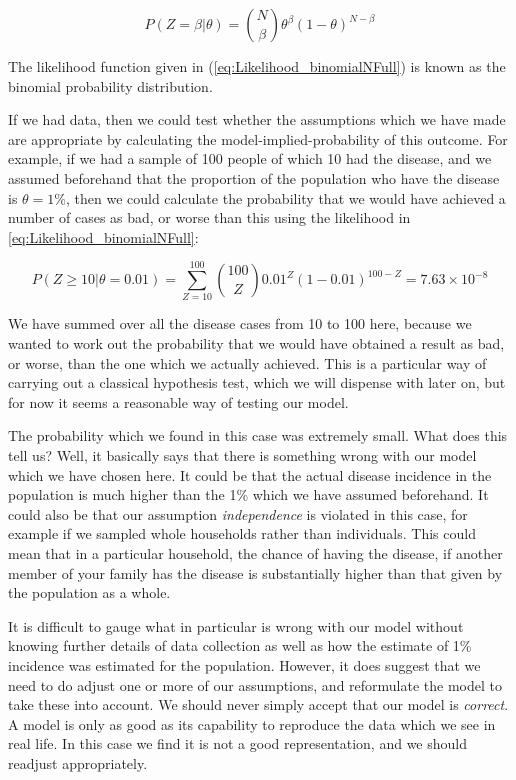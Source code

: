 \documentclass[11pt,fullpage]{book}
\begin{document}
\begin{equation}
P(Z=\beta|\theta) = {N \choose \beta} \theta^\beta (1-\theta)^{N-\beta}
\end{equation}\label{eq:Likelihood_binomialNFull}

The likelihood function given in (\ref{eq:Likelihood_binomialNFull}) is known as the binomial probability distribution.

If we had data, then we could test whether the assumptions which we have made are appropriate by calculating the model-implied-probability of this outcome. For example, if we had a sample of 100 people of which 10 had the disease, and we assumed beforehand that the proportion of the population who have the disease is $\theta=1\%$, then we could calculate the probability that we would have achieved a number of cases as bad, or worse than this using the likelihood in \ref{eq:Likelihood_binomialNFull}:

\begin{equation}
P(Z\geq 10|\theta=0.01) = \sum\limits_{Z=10}^{100}{100 \choose Z} 0.01^Z (1-0.01)^{100-Z} = 7.63 \times 10^{-8}
\end{equation}\label{eq:Likelihood_binomialTest}

We have summed over all the disease cases from 10 to 100 here, because we wanted to work out the probability that we would have obtained a result as bad, or worse, than the one which we actually achieved. This is a particular way of carrying out a classical hypothesis test, which we will dispense with later on, but for now it seems a reasonable way of testing our model. 

The probability which we found in this case was extremely small. What does this tell us? Well, it basically says that there is something wrong with our model which we have chosen here. It could be that the actual disease incidence in the population is much higher than the 1\% which we have assumed beforehand. It could also be that our assumption \textit{independence} is violated in this case, for example if we sampled whole households rather than individuals. This could mean that in a particular household, the chance of having the disease, if another member of your family has the disease is substantially higher than that given by the population as a whole. 

It is difficult to gauge what in particular is wrong with our model without knowing further details of data collection as well as how the estimate of 1\% incidence was estimated for the population. However, it does suggest that we need to do adjust one or more of our assumptions, and reformulate the model to take these into account. We should never simply accept that our model is \textit{correct}. A model is only as good as its capability to reproduce the data which we see in real life. In this case we find it is not a good representation, and we should readjust appropriately.
\end{document}

